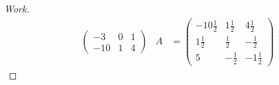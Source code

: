 \documentclass{article}
\begin{document}
\begin{proof}[Work]
\begin{align*}
\begin{pmatrix}
                        -3  & 0  & 1  \\
                        -10 & 1  & 4
                      \end{pmatrix}  & A   & = \begin{pmatrix}
                                                 -10\frac{1}{2} & 1\frac{1}{2} & 4\frac{1}{2}  \\
                                                 1\frac{1}{2}   & \frac{1}{2}  & -\frac{1}{2}  \\
                                                 5              & -\frac{1}{2} & -1\frac{1}{2}
                                               \end{pmatrix}
  \end{align*}
\end{proof}
\qdash
\end{document}
